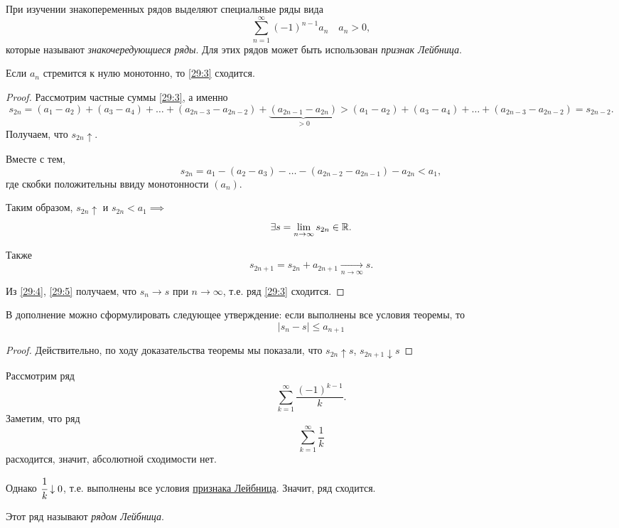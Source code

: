 \documentclass[../../main.tex]{subfiles}
\begin{document}
	При изучении знакопеременных рядов выделяют специальные ряды вида
	\begin{equation}
		\sum_{n = 1}^\infty (-1)^{n - 1}a_n\quad a_n > 0,
		\label{29:3}
	\end{equation}
	которые называют \emph{знакочередующиеся ряды}. Для этих рядов может быть использован \emph{признак Лейбница}.
	\begin{thm}\label{29:leibnitz}
		Если $a_n$ стремится к нулю монотонно, то \eqref{29:3} сходится.
	\end{thm}
	\begin{proof}
		Рассмотрим частные суммы \eqref{29:3}, а именно
		\[s_{2n} = (a_1 - a_2) + (a_3 - a_4) + \ldots + (a_{2n - 3} - a_{2n - 2}) + \underbrace{(a_{2n - 1} - a_{2n})}_{> 0} > (a_1 - a_2) + (a_3 - a_4) + \ldots + (a_{2n - 3} - a_{2n - 2}) = s_{2n - 2}.\]
		Получаем, что $s_{2n}\uparrow$.
		
		Вместе с тем,
		\[s_{2n} = a_1 - (a_{2} - a_3) - \ldots - (a_{2n - 2} - a_{2n - 1}) - a_{2n} < a_1,\]
		где скобки положительны ввиду монотонности $(a_n)$.
		
		Таким образом, $s_{2n}\uparrow$ и $s_{2n} < a_1\implies $
		\begin{equation}
			\exists s = \lim\limits_{n\to\infty}s_{2n}\in\mathbb{R}.
			\label{29:4}
		\end{equation}
		
		Также 
		\begin{equation}
			s_{2n + 1} = s_{2n} + a_{2n + 1}\underset{n\to\infty}{\longrightarrow}s.
			\label{29:5}
		\end{equation}
		
		Из \eqref{29:4}, \eqref{29:5} получаем, что $s_n\to s$ при $n\to\infty$, т.е. ряд \eqref{29:3} сходится.
	\end{proof}

	В дополнение можно сформулировать следующее утверждение: если выполнены все условия теоремы, то
	\begin{equation}
		\left|s_n - s\right|\leqslant a_{n + 1}
		\label{29:6}
	\end{equation}
	\begin{proof}
		Действительно, по ходу доказательства теоремы мы показали, что $s_{2n}\uparrow s$, $s_{2n + 1}\downarrow s$
	\end{proof}

	\begin{example}
		Рассмотрим ряд
		\[\sum_{k = 1}^\infty\frac{(-1)^{k - 1}}{k}.\]
		Заметим, что ряд
		\[\sum_{k = 1}^\infty\frac{1}{k}\]
		расходится, значит, абсолютной сходимости нет.
		
		Однако $\cfrac{1}{k}\downarrow0$, т.е. выполнены все условия \href{29:leibnitz}{признака Лейбница}. Значит, ряд сходится.
		
		Этот ряд называют \emph{рядом Лейбница}.
	\end{example}
\end{document}

